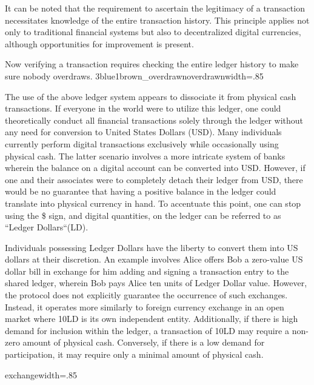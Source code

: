 It can be noted that the requirement to ascertain the legitimacy of a transaction necessitates knowledge of the entire
transaction history. This principle applies not only to traditional financial systems but also to decentralized digital
currencies, although opportunities for improvement is present.

{Now verifying a transaction requires checking the entire ledger history to make sure nobody overdraws.}
{3blue1brown_overdrawn}{overdrawn}{width=.85\textwidth}%

The use of the above ledger system appears to dissociate it from physical cash transactions. If everyone in the world were
to utilize this ledger, one could theoretically conduct all financial transactions solely through the ledger without any
need for conversion to United States Dollars (USD). Many individuals currently perform digital transactions exclusively
while occasionally using physical cash. The latter scenario involves a more intricate system of banks wherein the balance
on a digital account can be converted into USD. However, if one and their associates were to completely detach their ledger
from USD, there would be no guarantee that having a positive balance in the ledger could translate into physical currency
in hand. To accentuate this point, one can stop using the \$ sign, and digital quantities, on the ledger can be referred
to as ``Ledger Dollars``(LD).

Individuals possessing Ledger Dollars have the liberty to convert them into US dollars at their discretion. An example
involves Alice offers Bob a zero-value US dollar bill in exchange for him adding and signing a transaction entry to the
shared ledger, wherein Bob pays Alice ten units of Ledger Dollar value. However, the protocol does not explicitly guarantee
the occurrence of such exchanges. Instead, it operates more similarly to foreign currency exchange in an open market where
10LD is its own independent entity. Additionally, if there is high demand for inclusion within the ledger, a transaction
of 10LD may require a non-zero amount of physical cash. Conversely, if there is a low demand for participation, it may
require only a minimal amount of physical cash.

{exchange}{width=.85\textwidth}%

